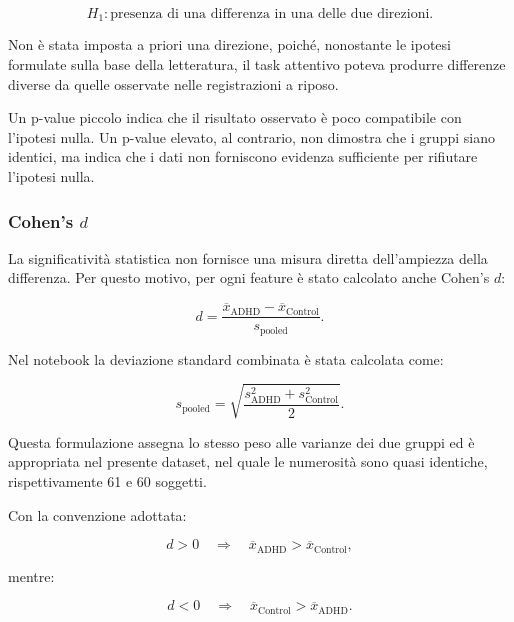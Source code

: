 \begin{equation}
	H_1:
	\text{presenza di una differenza in una delle due direzioni}.
\end{equation}

Non è stata imposta a priori una direzione, poiché, nonostante le
ipotesi formulate sulla base della letteratura, il task attentivo
poteva produrre differenze diverse da quelle osservate nelle
registrazioni a riposo.

Un p-value piccolo indica che il risultato osservato è poco
compatibile con l'ipotesi nulla. Un p-value elevato, al contrario,
non dimostra che i gruppi siano identici, ma indica che i dati non
forniscono evidenza sufficiente per rifiutare l'ipotesi nulla.


\subsubsection{Cohen's \texorpdfstring{$d$}{d}}

La significatività statistica non fornisce una misura diretta
dell'ampiezza della differenza. Per questo motivo, per ogni feature è
stato calcolato anche Cohen's $d$:

\begin{equation}
	d
	=
	\frac{
		\overline{x}_{\mathrm{ADHD}}
		-
		\overline{x}_{\mathrm{Control}}
	}{
		s_{\mathrm{pooled}}
	}.
\end{equation}

Nel notebook la deviazione standard combinata è stata calcolata come:

\begin{equation}
	s_{\mathrm{pooled}}
	=
	\sqrt{
		\frac{
			s_{\mathrm{ADHD}}^2
			+
			s_{\mathrm{Control}}^2
		}{2}
	}.
\end{equation}

Questa formulazione assegna lo stesso peso alle varianze dei due
gruppi ed è appropriata nel presente dataset, nel quale le numerosità
sono quasi identiche, rispettivamente 61 e 60 soggetti.

Con la convenzione adottata:

\begin{equation}
	d>0
	\quad\Longrightarrow\quad
	\overline{x}_{\mathrm{ADHD}}
	>
	\overline{x}_{\mathrm{Control}},
\end{equation}

mentre:

\begin{equation}
	d<0
	\quad\Longrightarrow\quad
	\overline{x}_{\mathrm{Control}}
	>
	\overline{x}_{\mathrm{ADHD}}.
\end{equation}

